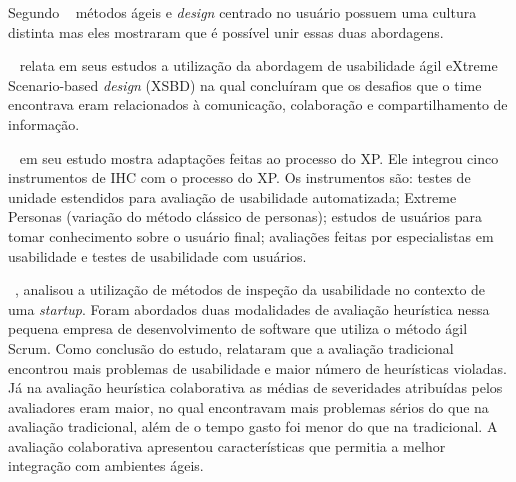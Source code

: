 Segundo ~ métodos ágeis e \emph{design} centrado no usuário possuem uma cultura distinta mas eles mostraram que é possível unir essas duas abordagens.


~ relata em seus estudos a utilização da abordagem de usabilidade ágil eXtreme Scenario-based \emph{design} (XSBD) na qual concluíram que os desafios que o time encontrava eram relacionados à comunicação, colaboração e compartilhamento de informação.

~ em seu estudo mostra adaptações feitas ao processo do XP. Ele integrou cinco instrumentos de IHC com o processo do XP. Os instrumentos são: testes de unidade estendidos para avaliação de usabilidade automatizada; Extreme Personas (variação do método clássico de personas); estudos de usuários para tomar conhecimento sobre o usuário final; avaliações feitas por especialistas em usabilidade e testes de usabilidade com usuários.
 
~, analisou a utilização de métodos de inspeção da usabilidade no contexto de uma \textit{startup}. Foram abordados duas modalidades de avaliação heurística nessa pequena empresa de desenvolvimento de software que utiliza o método ágil Scrum. Como conclusão do estudo, relataram que a avaliação tradicional encontrou mais problemas de usabilidade e maior número de heurísticas violadas. Já na avaliação heurística colaborativa as médias de severidades atribuídas pelos avaliadores eram maior, no qual encontravam mais problemas sérios do que na avaliação tradicional, além de o tempo gasto foi menor do que na tradicional. A avaliação colaborativa apresentou características que permitia a melhor integração com ambientes ágeis.


